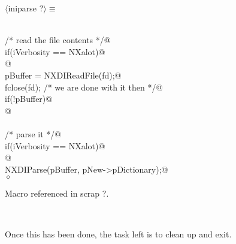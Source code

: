 \documentclass[12pt]{article}
\begin{document}
\begin{flushleft} \small
\begin{minipage}{\linewidth} \label{scrap9}
$\langle$iniparse {\footnotesize ?}$\rangle\equiv$
\vspace{-1ex}
\begin{list}{}{} \item
\mbox{}\verb@@\\
\mbox{}\verb@       /* read the file contents */@\\
\mbox{}\verb@       if(iVerbosity == NXalot)@\\
\mbox{}@\\
\mbox{}\verb@       pBuffer = NXDIReadFile(fd);@\\
\mbox{}\verb@       fclose(fd); /* we are done with it then */@\\
\mbox{}\verb@       if(!pBuffer)@\\
\mbox{}@\\
\mbox{}\verb@@\\
\mbox{}\verb@       /* parse it */@\\
\mbox{}\verb@       if(iVerbosity == NXalot)@\\
\mbox{}@\\
\mbox{}\verb@       NXDIParse(pBuffer, pNew->pDictionary);@\\
\mbox{}\verb@@$\diamond$
\end{list}
\vspace{-1ex}
\footnotesize\addtolength{\baselineskip}{-1ex}
\begin{list}{}{\setlength{\itemsep}{-\parsep}\setlength{\itemindent}{-\leftmargin}}
\item Macro referenced in scrap ?.
\end{list}
\end{minipage}\\[4ex]
\end{flushleft}
Once this has been done, the task left is to clean up and exit.  
\end{document}
